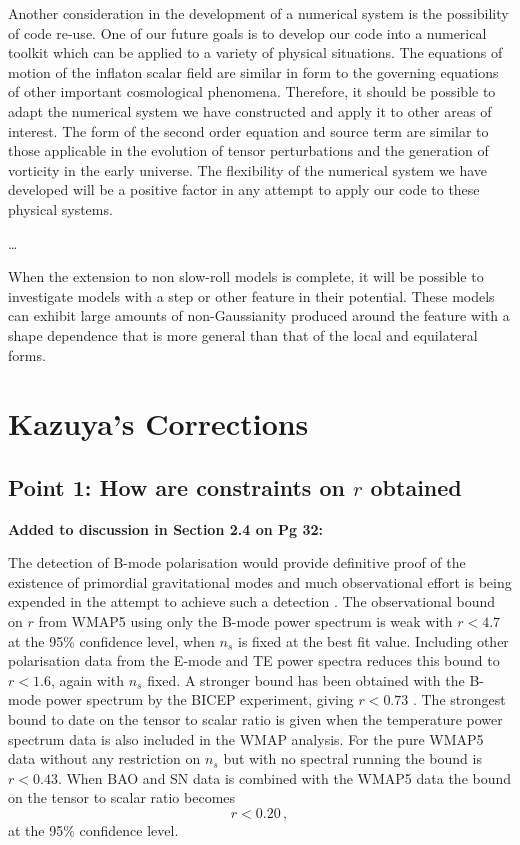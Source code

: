 Another consideration in the development of a numerical system is the possibility of
code re-use. One of our future goals is to develop our code into a numerical toolkit which
can be applied to a variety of physical situations.
The equations of motion of the inflaton scalar field are similar in form
to the governing equations of other important cosmological phenomena. Therefore, it
should be possible to adapt the numerical system we have constructed and apply it to
other areas of interest. The form of the second order equation and source term are similar to those
applicable in the evolution of tensor perturbations and the
generation of vorticity in the early universe. The flexibility of the numerical system we have
developed will be a positive factor in any attempt to apply our code to these physical systems. 

\ldots

When the extension to non slow-roll models
is complete, it will be possible to investigate models with a step or other feature in their
potential. These models can exhibit large amounts of non-Gaussianity produced around the feature
with a shape dependence that is more general than that of the local and equilateral forms.



\section{Kazuya's Corrections}
\subsection{Point 1: How are constraints on \texorpdfstring{$r$}{r} obtained}
\textbf{Added to discussion in Section 2.4 on Pg 32:}

The detection of B-mode polarisation would provide definitive proof of the existence of primordial
gravitational modes and much observational effort is being expended in the attempt to achieve such
a detection \cite{Seljak:1996gy, Baumann:2008aq,Chiang:2009xs,Piacentini2006,Sievers2007,vpj}.
The observational bound on $r$ from WMAP5 using only the B-mode power spectrum
is weak with $r< 4.7$ at the 95\% confidence level, when $n_s$ is fixed at the best fit value.
Including other polarisation data from the E-mode and TE power spectra reduces this bound to
$r<1.6$, again with $n_s$ fixed. A stronger bound has been obtained with the B-mode
power spectrum by the BICEP experiment, giving $r<0.73$ \cite{Chiang:2009xs}. The
strongest bound to date on the tensor to scalar ratio is given when the temperature power spectrum
data is also included in the WMAP analysis. For the pure WMAP5 data without any restriction on
$n_s$ but with no spectral running the bound is $r<0.43$. When BAO and SN data is combined with the
WMAP5 data the bound on the tensor to scalar ratio becomes
% 
\begin{equation}
\label{eq:rbound-corr}
 r < 0.20\,,
\end{equation}
at the 95\% confidence level. 

